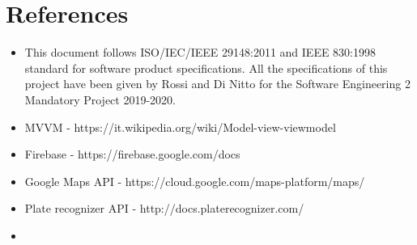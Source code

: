 \documentclass[../RASD.tex]{subfiles}
\begin{document}
\chapter{References}\label{ch:references}
    \begin{itemize}
        \item This document follows ISO/IEC/IEEE 29148:2011 and IEEE 830:1998 standard for software product specifications.
        All the specifications of this project have been given by Rossi and Di Nitto for the Software Engineering 2 Mandatory Project 2019-2020.
        \item MVVM - https://it.wikipedia.org/wiki/Model-view-viewmodel
        \item Firebase - https://firebase.google.com/docs
        \item Google Maps API - https://cloud.google.com/maps-platform/maps/
        \item Plate recognizer API - http://docs.platerecognizer.com/
    \item \end{itemize}
\end{document}
